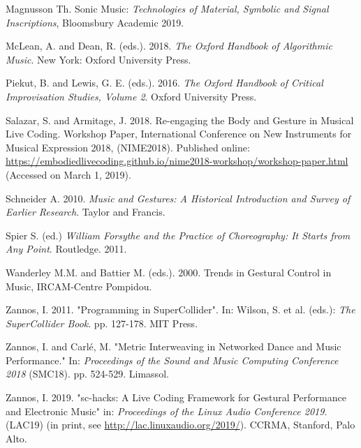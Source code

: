 Magnusson Th. Sonic Music: \emph{Technologies of Material, Symbolic and Signal Inscriptions}, Bloomsbury Academic 2019. 

McLean, A. and Dean, R. (eds.). 2018. \emph{The Oxford Handbook of Algorithmic Music}. New York: Oxford University Press.

Piekut, B. and Lewis, G. E. (eds.). 2016. \emph{The Oxford Handbook of Critical Improvisation Studies, Volume 2}. Oxford University Press. 

Salazar, S. and Armitage, J. 2018. Re-engaging the Body and Gesture in Musical Live Coding. Workshop Paper, International Conference on New Instruments for Musical Expression 2018, (NIME2018). Published online: \url{https://embodiedlivecoding.github.io/nime2018-workshop/workshop-paper.html} (Accessed on March 1, 2019).

Schneider A. 2010. \emph{Music and Gestures: A Historical Introduction and Survey of Earlier Research}. Taylor and Francis. 

Spier S. (ed.) \emph{William Forsythe and the Practice of Choreography: It Starts from Any Point}. Routledge. 2011. 

Wanderley M.M. and Battier M. (eds.). 2000. Trends in Gestural Control in Music, IRCAM-Centre Pompidou.  

Zannos, I. 2011. "Programming in SuperCollider". In: Wilson, S. et al. (eds.): \emph{The SuperCollider Book}. pp. 127-178. MIT Press.

Zannos, I. and Carlé, M. "Metric Interweaving in Networked Dance and Music Performance." In: \emph{Proceedings of the Sound and Music Computing Conference 2018} (SMC18). pp. 524-529. Limassol. 

Zannos, I. 2019. "sc-hacks: A Live Coding Framework for Gestural Performance and Electronic Music" in: \emph{Proceedings of the Linux Audio Conference 2019.} (LAC19) (in print, see \url{http://lac.linuxaudio.org/2019/}). CCRMA, Stanford, Palo Alto.
